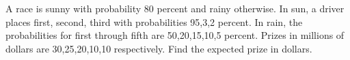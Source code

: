 A race is sunny with probability 80 percent and rainy otherwise. In sun, a driver places first, second, third with probabilities 95,3,2 percent. In rain, the probabilities for first through fifth are 50,20,15,10,5 percent. Prizes in millions of dollars are 30,25,20,10,10 respectively. Find the expected prize in dollars.
